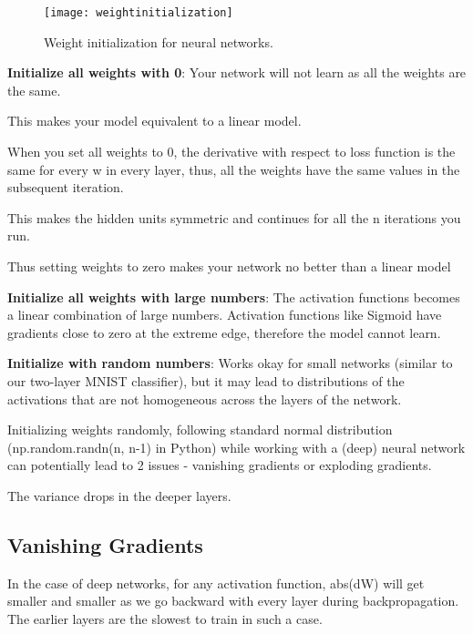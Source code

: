  	\begin{figure}[h]
		\centering
		\texttt{[image: weightinitialization]}
		\caption[Weight initialization for neural networks]{Weight initialization for neural networks.}
		\label{fig:weightinitialization}
	\end{figure}

	\begin{bulletedlist}
		\item {\bfseries Initialize all weights with 0}:  Your network will not learn as all the weights are the same.
		\begin{bulletedlist}
			\item This makes your model equivalent to a linear model.
			\item When you set all weights to 0, the derivative with respect to loss function is the same for every w in every layer, thus, all the weights have the same values in the subsequent iteration.
			\item This makes the hidden units symmetric and continues for all the n iterations you run.
			\item Thus setting weights to zero makes your network no better than a linear model
		\end{bulletedlist}
		\item {\bfseries Initialize all weights with large numbers}:  The activation functions becomes a linear combination of large numbers.  Activation functions like Sigmoid have gradients close to zero at the extreme edge, therefore the model cannot learn.
		\item {\bfseries Initialize with random numbers}: Works okay for small networks (similar to our two-layer MNIST classifier), but it may lead to distributions of the activations that are not homogeneous across the layers of the network.
		\begin{bulletedlist}
			\item Initializing weights randomly, following standard normal distribution (np.random.randn(n, n-1) in Python) while working with a (deep) neural network can potentially lead to 2 issues - vanishing gradients or exploding gradients.
			\item The variance drops in the deeper layers.
		\end{bulletedlist}
	\end{bulletedlist}

	\subsection{Vanishing Gradients}
In the case of deep networks, for any activation function, abs(dW) will get smaller and smaller as we go backward with every layer during backpropagation.  The earlier layers are the
slowest to train in such a case.

